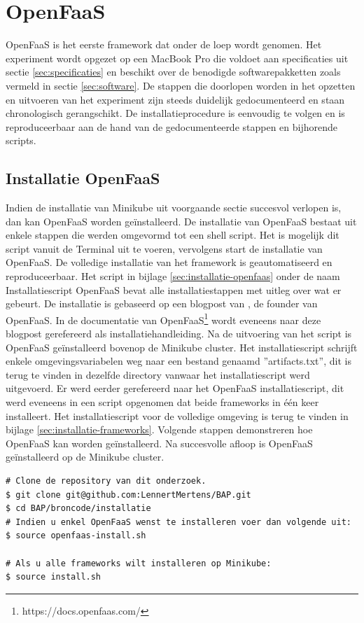 \newpage
\section{OpenFaaS}
OpenFaaS is het eerste framework dat onder de loep wordt genomen. Het experiment wordt opgezet op een MacBook Pro die voldoet aan specificaties uit sectie \ref{sec:specificaties} en beschikt over de benodigde softwarepakketten zoals vermeld in sectie \ref{sec:software}. De stappen die doorlopen worden in het opzetten en uitvoeren van het experiment zijn steeds duidelijk gedocumenteerd en staan chronologisch gerangschikt. De installatieprocedure is eenvoudig te volgen en is reproduceerbaar aan de hand van de gedocumenteerde stappen en bijhorende scripts.

\subsection{Installatie OpenFaaS}
Indien de installatie van Minikube uit voorgaande sectie succesvol verlopen is, dan kan OpenFaaS worden geïnstalleerd. De installatie van OpenFaaS bestaat uit enkele stappen die werden omgevormd tot een shell script. Het is mogelijk dit script vanuit de Terminal uit te voeren, vervolgens start de installatie van OpenFaaS. De volledige installatie van het framework is geautomatiseerd en reproduceerbaar. Het script in bijlage \ref{sec:installatie-openfaas} onder de naam Installatiescript OpenFaaS bevat alle installatiestappen met uitleg over wat er gebeurt. De installatie is gebaseerd op een blogpost van \textcite{Ellis2017}, de founder van OpenFaaS. In de documentatie van OpenFaaS\footnote{https://docs.openfaas.com/} wordt eveneens naar deze blogpost gerefereerd als installatiehandleiding. Na de uitvoering van het script is OpenFaaS geïnstalleerd bovenop de Minikube cluster. Het installatiescript schrijft enkele omgevingsvariabelen weg naar een bestand genaamd ''artifacts.txt'', dit is terug te vinden in dezelfde directory vanwaar het installatiescript werd uitgevoerd. Er werd eerder gerefereerd naar het OpenFaaS installatiescript, dit werd eveneens in een script opgenomen dat beide frameworks in één keer installeert. Het installatiescript voor de volledige omgeving is terug te vinden in bijlage \ref{sec:installatie-frameworks}. Volgende stappen demonstreren hoe OpenFaaS kan worden geïnstalleerd. Na succesvolle afloop is OpenFaaS geïnstalleerd op de Minikube cluster.

\begin{lstlisting}
# Clone de repository van dit onderzoek.
$ git clone git@github.com:LennertMertens/BAP.git
$ cd BAP/broncode/installatie
# Indien u enkel OpenFaaS wenst te installeren voer dan volgende uit:
$ source openfaas-install.sh

# Als u alle frameworks wilt installeren op Minikube:
$ source install.sh
\end{lstlisting}

